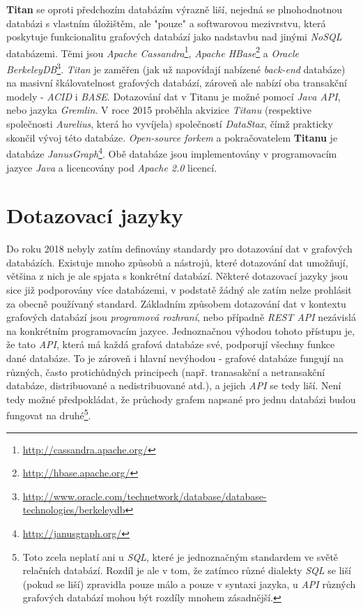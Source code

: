 \textbf{Titan} se oproti předchozím databázím výrazně liší, nejedná se plnohodnotnou databázi s vlastním úložištěm, ale "pouze" a softwarovou mezivrstvu, která poskytuje funkcionalitu grafových databází jako nadstavbu nad jinými \textit{NoSQL} databázemi. Těmi jsou \textit{Apache Cassandra}\footnote{\url{http://cassandra.apache.org/}}, \textit{Apache HBase}\footnote{\url{http://hbase.apache.org/}} a \textit{Oracle BerkeleyDB}\footnote{\url{http://www.oracle.com/technetwork/database/database-technologies/berkeleydb}}.
\textit{Titan} je zaměřen (jak už napovídají nabízené \textit{back-end} databáze) na masivní škálovatelnost grafových databází, zároveň ale nabízí oba transakční modely - \textit{ACID} i \textit{BASE}. Dotazování dat v Titanu je možné pomocí \textit{Java API}, nebo jazyka \textit{Gremlin}. V roce 2015 proběhla akvizice \textit{Titanu} (respektive společnosti \textit{Aurelius}, která ho vyvíjela) společností \textit{DataStax}, čímž prakticky skončil vývoj této databáze. \textit{Open-source forkem} a pokračovatelem\cite{Datami17} \textbf{Titanu} je databáze \textit{JanusGraph}\footnote{\url{http://janusgraph.org/}}. Obě databáze jsou implementovány v programovacím jazyce \textit{Java} a licencovány pod \textit{Apache 2.0} licencí.


\section{Dotazovací jazyky}
\label{sec:gdb-jazyky}

Do roku 2018 nebyly zatím definovány standardy pro dotazování dat v grafových databázích. Existuje mnoho způsobů a nástrojů, které dotazování dat umožňují, většina z nich je ale spjata s konkrétní databází. Některé dotazovací jazyky jsou sice již podporovány více databázemi, v podstatě žádný ale zatím nelze prohlásit za obecně používaný standard. Základním způsobem dotazování dat v kontextu grafových databází jsou \textit{programová rozhraní}, nebo případně \textit{REST API} nezávislá na konkrétním programovacím jazyce. Jednoznačnou výhodou tohoto přístupu je, že tato \textit{API}, která má každá grafová databáze své, podporují všechny funkce dané databáze. To je zároveň i hlavní nevýhodou - grafové databáze fungují na různých, často protichůdných principech (např. tranasakční a netransakční databáze, distribuované a nedistribuované atd.), a jejich \textit{API} se tedy liší. Není tedy možné předpokládat, že průchody grafem napsané pro jednu databázi budou fungovat na druhé\footnote{Toto zcela neplatí ani u \textit{SQL}, které je jednoznačným standardem ve světě relačních databází. Rozdíl je ale v tom, že zatímco různé dialekty \textit{SQL} se liší (pokud se liší) zpravidla pouze málo a pouze v syntaxi jazyka, u \textit{API} různých grafových databází mohou být rozdíly mnohem zásadnější.}.

